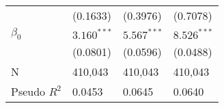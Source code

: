 \begin{tabular}{llll}
                                       &           (0.1633) &           (0.3976) &           (0.7078) \\
$\beta_0$                              &      $3.160^{***}$ &      $5.567^{***}$ &      $8.526^{***}$ \\
                                       &           (0.0801) &           (0.0596) &           (0.0488) \\
N                                      &            410,043 &            410,043 &            410,043 \\
Pseudo $R^2$                           &             0.0453 &             0.0645 &             0.0640 \\
\bottomrule
\end{tabular}
